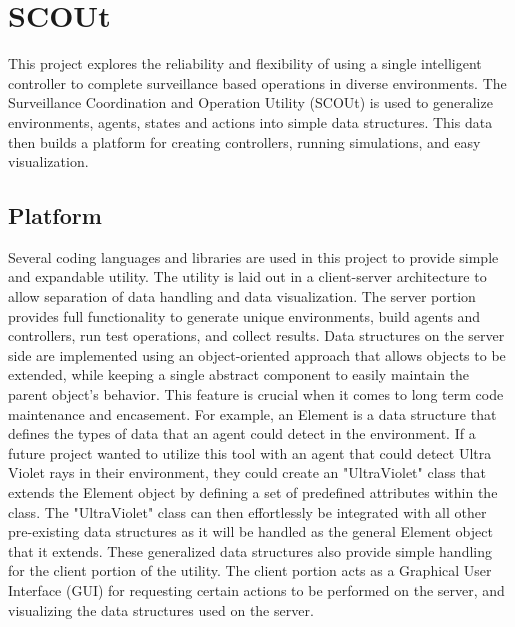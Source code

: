 

\chapter{SCOUt}
This project explores the reliability and flexibility of using a single intelligent controller to complete surveillance based operations in diverse environments.
The Surveillance Coordination and Operation Utility (SCOUt) is used to generalize environments, agents, states and actions into simple data structures.
This data then builds a platform for creating controllers, running simulations, and easy visualization.





\section{Platform}
Several coding languages and libraries are used in this project to provide simple and expandable utility.
The utility is laid out in a client-server architecture to allow separation of data handling and data visualization.
The server portion provides full functionality to generate unique environments, build agents and controllers, run test operations, and collect results.
Data structures on the server side are implemented using an object-oriented approach that allows objects to be extended, while keeping a single abstract component to easily maintain the parent object's behavior.
This feature is crucial when it comes to long term code maintenance and encasement.
For example, an Element is a data structure that defines the types of data that an agent could detect in the environment.
If a future project wanted to utilize this tool with an agent that could detect Ultra Violet rays in their environment, they could create an "UltraViolet" class that extends the Element object by defining a set of predefined attributes within the class.
The "UltraViolet" class can then effortlessly be integrated with all other pre-existing data structures as it will be handled as the general Element object that it extends.
These generalized data structures also provide simple handling for the client portion of the utility.
The client portion acts as a Graphical User Interface (GUI) for requesting certain actions to be performed on the server, and visualizing the data structures used on the server.



